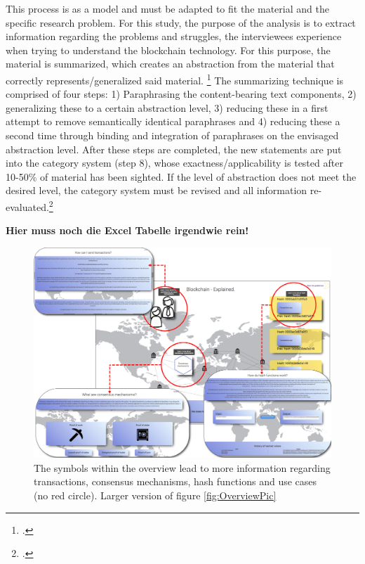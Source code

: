 This process is as a model and must be adapted to fit the material and the specific research problem. For this study, the purpose of the analysis is to extract information regarding the problems and struggles, the interviewees experience when trying to understand the blockchain technology. For this purpose, the material is summarized, which creates an abstraction from the material that correctly represents/generalized said material. \footcite[Cf.][p.68]{MayringQualitativeContentAnalysis2014} The summarizing technique is comprised of four steps: 1) Paraphrasing the content-bearing text components, 2) generalizing these to a certain abstraction level, 3) reducing these in a first attempt to remove semantically identical paraphrases and 4) reducing these a second time through binding and integration of paraphrases on the envisaged abstraction level. After these steps are completed, the new statements are put into the category system (step 8), whose exactness/applicability is tested after 10-50\% of material has been sighted. If the level of abstraction does not meet the desired level, the category system must be revised and all information re-evaluated.\footcite[Cf.][p.68 et seq]{MayringQualitativeContentAnalysis2014}

 \label{Anhang Teil Mayring Kategoriensystem}


\textbf{Hier muss noch die Excel Tabelle irgendwie rein!}



\begin{figure}[H]
    \centering
    \includegraphics[height=0.9\textwidth, angle=90]{latex-vorlage_v1.5/graphics/Overview_Big.png}
    \caption{The symbols within the overview lead to more information regarding transactions, consensus mechanisms, hash functions and use cases (no red circle). Larger version of figure \ref{fig:OverviewPic}}
    \label{fig:my_label}
\end{figure}


